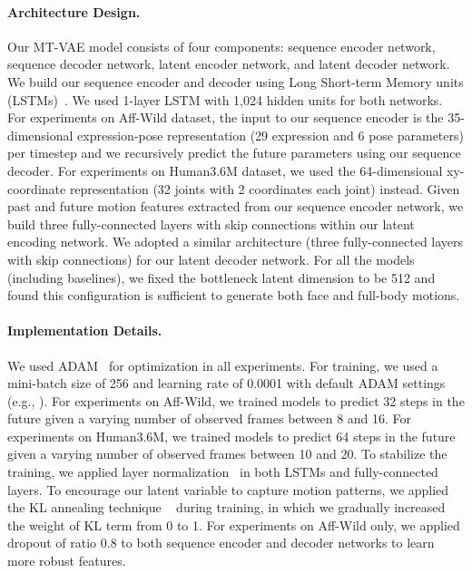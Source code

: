 \documentclass[runningheads]{llncs}
\begin{document}
\paragraph{Architecture Design.}
\vspace*{-0.1in}
Our MT-VAE model consists of four components: sequence encoder network, sequence decoder network, latent encoder network, and latent decoder network.
We build our sequence encoder and decoder using Long Short-term Memory units (LSTMs)~\cite{hochreiter1997long}. We used 1-layer LSTM with 1,024 hidden units for both networks.
For experiments on Aff-Wild dataset, the input to our sequence encoder is the 35-dimensional expression-pose representation (29 expression and 6 pose parameters) per timestep and we recursively predict the future parameters using our sequence decoder.
For experiments on Human3.6M dataset, we used the 64-dimensional xy-coordinate representation (32 joints with 2 coordinates each joint) instead.
Given past and future motion features extracted from our sequence encoder network, we build three fully-connected layers with skip connections within our latent encoding network.
We adopted a similar architecture (three fully-connected layers with skip connections) for our latent decoder network.
For all the models (including baselines), we fixed the bottleneck latent dimension to be 512 and found this configuration is sufficient to generate both face and full-body motions.


\paragraph{Implementation Details.}
We used ADAM~\cite{kingma2014adam} for optimization in all experiments.
For training, we used a mini-batch size of 256 and learning rate of 0.0001 with default ADAM settings (e.g., ).
For experiments on Aff-Wild, we trained models to predict 32 steps in the future given a varying number of observed frames between 8 and 16.
For experiments on Human3.6M, we trained models to predict 64 steps in the future given a varying number of observed frames between 10 and 20.
To stabilize the training, we applied layer normalization~\cite{ba2016layer} in both LSTMs and fully-connected layers.
To encourage our latent variable to capture motion patterns, we applied the KL annealing technique ~\cite{bowman2015generating} during training, in which we gradually increased the weight of KL term from 0 to 1.
For experiments on Aff-Wild only, we applied dropout of ratio 0.8 to both sequence encoder and decoder networks to learn more robust features.
\end{document}
